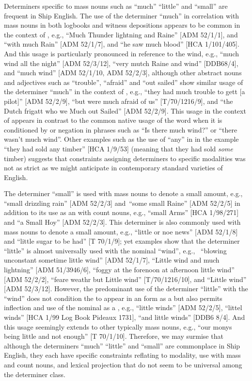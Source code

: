 Determiners specific to mass nouns such as “much” “little” and “small” are frequent in Ship English. The use of the determiner “much” in correlation with mass nouns in both logbooks and witness depositions appears to be common in the context of , e.g., “Much Thunder lightning and Raine” [ADM 52/1/1], and “with much Rain” [ADM 52/1/7], and “he saw much blood” [HCA 1/101/405]. And this usage is particularly pronounced in reference to the wind, e.g., “much wind all the night” [ADM 52/3/12], “very mutch Raine and wind” [DDB68/4], and “much wind” [ADM 52/1/10, ADM 52/2/3], although other abstract nouns and adjectives such as “trouble”, “afraid” and “out sailed” show similar usage of the determiner “much” in the context of , e.g., “they had much trouble to gett [a pilot]” [ADM 52/2/9], “but were much afraid of us” [T/70/1216/9], and “the Dutch frigatt who we Much out Sailed” [ADM 52/2/9]. This usage in the context of  appears in contrast to the common native usage of the word when it is conditioned by  or negation in phrases such as “Is there much wind?” or “there wasn’t much wind”. Other examples such as the use of “any” in  in the example “they had sold any timber” [HCA 1/9/53] (meaning that they had sold \textit{some} timber) suggests that constraints assigning determiners to specific modalities was not as strict as we might anticipate in contemporary standard varieties of English.  

The determiner “small” is used with  mass nouns to denote a small amount, e.g., “small drizzling rain” [ADM 52/2/3] and~“some small Raine” [ADM 52/2/5] in addition to its use as an  with count nouns, e.g., “small Arms” [HCA 1/98/271] and “a Small Hoy” [ADM 52/2/3]. This determiner is also commonly used with  mass nouns to denote a small amount, e.g., “little or noe news” [ADM 52/1/8] and “little sugar to be had” [T 70/1/9]; yet examples show that the determiner “little” is almost universally used with the nominal “wind”, e.g., ~“blowing unconstant sometime little wind” [ADM 52/1/7], “Little wind and much lightning” [ADM 51/3946/6], “foggy at the forenoon at afternoon little wind” [ADM 52/2/2], “feare weathr but Little wind” [T/70/1216/10], and “Little wind” [ADM 52/3/12]. However, the predominant use of the determiner “little” with the  “wind” does not condition the  to appear in an  form as a  but also permits inflection and use of the nominal as a , e.g., “little winds” [ADM 52/2/5], “littel winds” [HCA 1/99 Log Book Pideaux 1731], “and little winds” [DDB6 8/4]. And this usage seemingly extends to other typically mass nouns, e.g., “our monys being little and not enough” [T 70/1/10]. Therefore, we may surmise that although the determiners “much” “little” and “small” are commonplace in Ship English, they each have specific constraints reflating to modality, use with mass and count nouns, and lexical projection that do not seem to be universal among the determiner class.  

